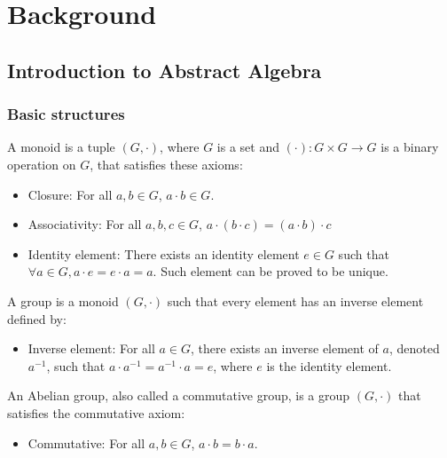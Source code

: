 \chapter{Background}
\label{chap-background}

\section{Introduction to Abstract Algebra}

\subsection{Basic structures}

\begin{definition}[Monoid]
A \textup{monoid} is a tuple $(G, \cdot)$, where $G$ is a set and $(\cdot) : G \times G \to G$ is a binary operation on $G$, that satisfies these axioms:
\begin{itemize}
    \item \textup{Closure:} For all $a, b \in G$, $a \cdot b \in G$.
    \item \textup{Associativity:} For all $a, b, c \in G$, $a \cdot (b \cdot c) = (a \cdot b) \cdot c$
    \item \textup{Identity element:} There exists an \textup{identity element} $e \in G$ such that $\forall a \in G, a \cdot e = e \cdot a = a$. Such element can be proved to be unique.
\end{itemize}
\end{definition}

\begin{definition}[Group]
A \textup{group} is a \textup{monoid} $(G, \cdot)$ such that every element has an \textup{inverse element} defined by:
\begin{itemize}
    \item \textup{Inverse element:} For all $a \in G$, there exists an \textup{inverse element} of $a$, denoted $a^{-1}$, such that $a \cdot a^{-1} = a^{-1} \cdot a = e$, where $e$ is the identity element.
\end{itemize}
\end{definition}

\begin{definition}
An \textup{Abelian group}, also called a \textup{commutative group}, is a group $(G, \cdot)$ that satisfies the commutative axiom:
\begin{itemize}
    \item \textup{Commutative:} For all $a, b \in G$, $a \cdot b = b \cdot a$.
\end{itemize}
\end{definition}

